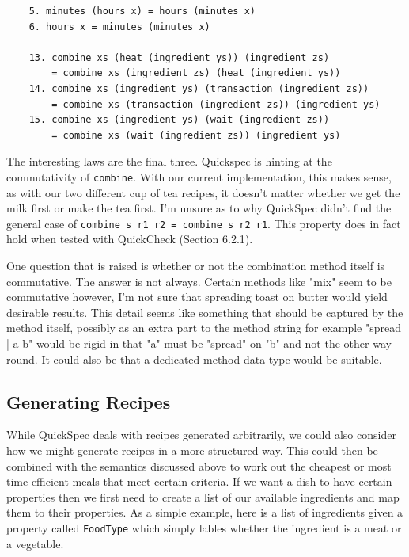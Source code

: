 \documentclass[11pt]{article}
\begin{document}
\begin{lstlisting}
    5. minutes (hours x) = hours (minutes x)
    6. hours x = minutes (minutes x)

    13. combine xs (heat (ingredient ys)) (ingredient zs)
        = combine xs (ingredient zs) (heat (ingredient ys))
    14. combine xs (ingredient ys) (transaction (ingredient zs))
        = combine xs (transaction (ingredient zs)) (ingredient ys)
    15. combine xs (ingredient ys) (wait (ingredient zs))
        = combine xs (wait (ingredient zs)) (ingredient ys)
\end{lstlisting}

The interesting laws are the final three. Quickspec is hinting at the
commutativity of \texttt{combine}. With our current implementation, this makes sense,
as with our two different cup of tea recipes, it doesn't matter whether
we get the milk first or make the tea first. I'm unsure as to why QuickSpec
didn't find the general case of \texttt{combine s r1 r2 = combine s r2 r1}.
This property does in fact hold when tested with QuickCheck (Section 6.2.1).

\medbreak

One question that is raised
is whether or not the combination method itself is commutative. The answer
is not always. Certain methods like "mix" seem to be commutative however,
I'm not sure that spreading toast on butter would yield desirable results.
This detail seems like something that should be captured by the method itself,
possibly as an extra part to the method string for example "spread | a b" would
be rigid in that "a" must be "spread" on "b" and not the other way round.
It could also be that a dedicated method data type would be suitable.

\subsection{Generating Recipes}

While QuickSpec deals with recipes generated arbitrarily, we could also
consider how we might generate recipes in a more structured way. This could
then be combined with the semantics discussed above to work out the cheapest
or most time efficient meals that meet certain criteria. If we want a dish
to have certain properties then we first need to create a list of our
available ingredients and map them to their properties. As a simple
example, here is a list of ingredients given a property called
\texttt{FoodType} which simply lables whether the ingredient is a meat
or a vegetable.
\end{document}
